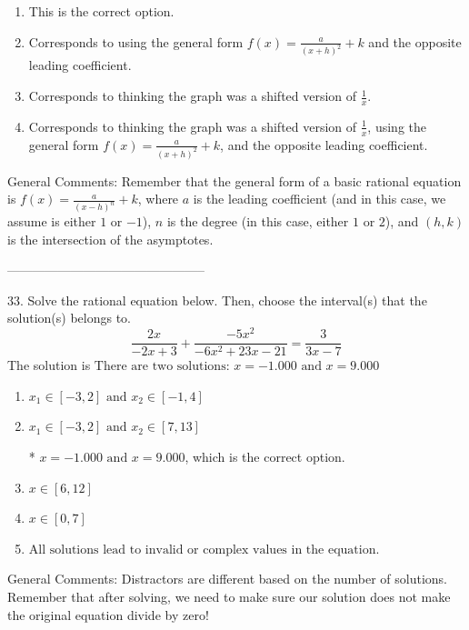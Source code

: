 \documentclass{extbook}[14pt]
\begin{document}
\begin{enumerate}[label=\Alph*.] 
\item This is the correct option.  
\item Corresponds to using the general form $f(x) = \frac{a}{(x+h)^2}+k$ and the opposite leading coefficient.  
\item Corresponds to thinking the graph was a shifted version of $\frac{1}{x}$.  
\item Corresponds to thinking the graph was a shifted version of $\frac{1}{x}$, using the general form $f(x) = \frac{a}{(x+h)^2}+k$, and the opposite leading coefficient.  
\end{enumerate} 
 
General Comments: Remember that the general form of a basic rational equation is $ f(x) = \frac{a}{(x-h)^n} + k$, where $a$ is the leading coefficient (and in this case, we assume is either $1$ or $-1$), $n$ is the degree (in this case, either $1$ or $2$), and $(h, k)$ is the intersection of the asymptotes.

-----------------------------------------------

33. Solve the rational equation below. Then, choose the interval(s) that the solution(s) belongs to.
\[ \frac{2x}{-2x + 3} + \frac{-5x^{2}}{-6x^{2} +23 x -21} = \frac{3}{3x -7} \] 
The solution is $ \text{There are two solutions: } x = -1.000 \text{ and } x = 9.000 $ 

\begin{enumerate}[label=\Alph*.] 
\item $ x_1 \in [-3, 2] \text{ and } x_2 \in [-1,4] $ 

  
\item $ x_1 \in [-3, 2] \text{ and } x_2 \in [7,13] $ 

 * $x = -1.000 \text{ and } x = 9.000$, which is the correct option. 
\item $ x \in [6,12] $ 

  
\item $ x \in [0,7] $ 

  
\item $ \text{All solutions lead to invalid or complex values in the equation.} $ 

  
\end{enumerate} 
 
General Comments: Distractors are different based on the number of solutions. Remember that after solving, we need to make sure our solution does not make the original equation divide by zero!
\end{document}
